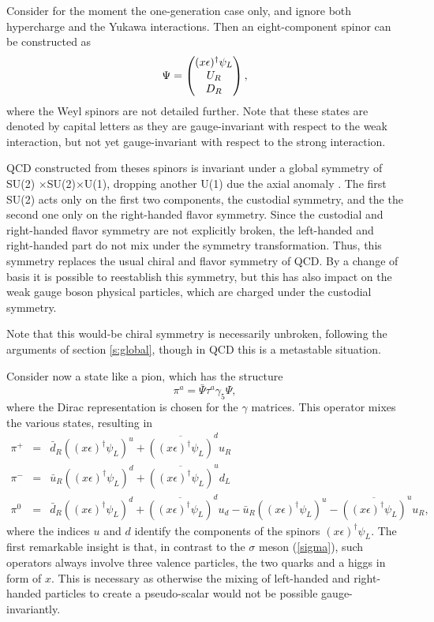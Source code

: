\documentclass[final,12pt,3p,longtitle]{elsarticle}
\newcommand*{\no}{\noindent}
\newcommand*{\bea}{\begin{eqnarray}}
\newcommand*{\eea}{\end{eqnarray}}
\newcommand*{\be}{\begin{equation}}
\newcommand*{\ee}{\end{equation}}
\newcommand*{\pref}[1]{(\ref{#1})}
\newcommand*{\nn}{\nonumber}
\newcommand*{\1}{1\!\!\!\bot}
\newcommand*{\bma}{\begin{matrix}}
\newcommand*{\ema}{\end{matrix}}
\newcommand*{\bpm}{\left(\bma}
\newcommand*{\epm}{\ema\right)}
\begin{document}
Consider for the moment the one-generation case only, and ignore both hypercharge and the Yukawa interactions. Then an eight-component spinor can be constructed as
\be
\Psi=\bpm (x\epsilon)^\dagger\psi_L\cr U_R \cr D_R\epm\label{qcdquark},
\ee
\no where the Weyl spinors are not detailed further. Note that these states are denoted by capital letters as they are gauge-invariant with respect to the weak interaction, but not yet gauge-invariant with respect to the strong interaction.

QCD constructed from theses spinors is invariant under a global symmetry of SU(2) $\times $SU(2)$\times $U(1), dropping another U(1) due the axial anomaly \cite{Bohm:2001yx}. The first SU(2) acts only on the first two components, the custodial symmetry, and the the second one only on the right-handed flavor symmetry. Since the custodial and right-handed flavor symmetry are not explicitly broken, the left-handed and right-handed part do not mix under the symmetry transformation. Thus, this symmetry replaces the usual chiral and flavor symmetry of QCD. By a change of basis it is possible to reestablish this symmetry, but this has also impact on the weak gauge boson physical particles, which are charged under the custodial symmetry.

Note that this would-be chiral symmetry is necessarily unbroken, following the arguments of section \ref{s:global}, though in QCD this is a metastable situation.

Consider now a state like a pion, which has the structure
\be
\pi^a=\bar{\Psi}\tau^a\gamma_5\Psi\nn,
\ee
\no where the Dirac representation is chosen for the $\gamma$ matrices. This operator mixes the various states, resulting in
\bea
\pi^{+}&=&\bar{d}_R ((x\epsilon)^\dagger\psi_L)^u+\overline{((x\epsilon)^\dagger\psi_L)}^du_R\label{pi1}\\
\pi^{-}&=&\bar{u}_R ((x\epsilon)^\dagger\psi_L)^d+\overline{((x\epsilon)^\dagger\psi_L)}^ud_L\\
\pi^0&=&\bar{d}_R ((x\epsilon)^\dagger\psi_L)^d+\overline{((x\epsilon)^\dagger\psi_L)}^du_d-\bar{u}_R ((x\epsilon)^\dagger\psi_L)^u-\overline{((x\epsilon)^\dagger\psi_L)}^uu_R\label{pi3},
\eea
\no where the indices $u$ and $d$ identify the components of the spinors $(x\epsilon)^\dagger\psi_L$. The first remarkable insight is that, in contrast to the $\sigma$ meson \pref{sigma}, such operators always involve three valence particles, the two quarks and a higgs in form of $x$. This is necessary as otherwise the mixing of left-handed and right-handed particles to create a pseudo-scalar would not be possible gauge-invariantly.
\end{document}
